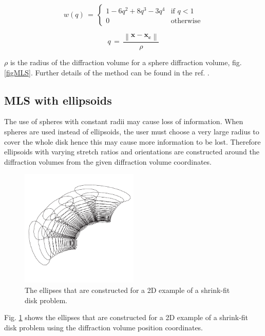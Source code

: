 \documentclass{article}
\begin{document}
\begin{equation}
w(q) \,=\,  \left \{ \begin{array}{ll}
					1-6q^2+8q^3-3q^4 & \mbox{if $q < 1$} \\
					0 & \mbox{otherwise}
					\end{array}
					 \right.
\label{eqspline}					 
\end{equation}   

\begin{equation}
q\,=\,  \dfrac{\left\|\mathbf{x}-\mathbf{x_c}\right\| }{\rho}
\end{equation}

$\rho$ is the radius of the diffraction volume for a sphere diffraction volume, fig. \ref{figMLS}. Further details of the method can be found in the ref. \cite{Belytschko96}.



\subsection{MLS with ellipsoids}
The use of spheres with constant radii may cause loss of information. When spheres are used instead of ellipsoids, the user must choose a very large radius to cover the whole disk hence this may cause more information to be lost. Therefore ellipsoids with varying stretch ratios and orientations are constructed around the diffraction volumes from the given diffraction volume coordinates. 

\begin{figure}[!ht]
    \centering
            \includegraphics[width=0.5\textwidth]{2Dellipses.pdf}
    \caption{The ellipses that are constructed for a 2D example of a shrink-fit disk problem.}
    \label{2Del}
\end{figure}

Fig. \ref{2Del} shows the ellipses that are constructed for a 2D example of a shrink-fit disk problem using the diffraction volume position coordinates.  
\end{document}
